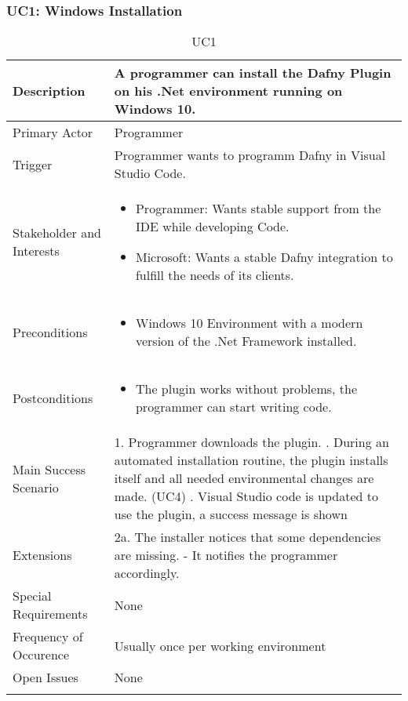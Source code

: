 \subsubsection{UC1: Windows Installation}
\begin{longtable}{l | p{} }
	Description & A programmer can install the Dafny Plugin on his .Net environment running on Windows 10.\\ \hline
	Primary Actor & Programmer\\ \hline
	Trigger & Programmer wants to programm Dafny in Visual Studio Code.\\ \hline
	Stakeholder and Interests & 
	\begin{itemize}
		\item Programmer: Wants stable support from the IDE while developing Code.
		\item Microsoft: Wants a stable Dafny integration to fulfill the needs of its clients.
	\end{itemize} \\ \hline
	Preconditions & 
 \begin{itemize}
		\item Windows 10 Environment with a modern version of the .Net Framework installed.
	\end{itemize} \\ \hline
	Postconditions & 
	\begin{itemize}
		\item The plugin works without problems, the programmer can start writing code.
	\end{itemize} \\ \hline
	Main Success Scenario & 1. Programmer downloads the plugin. \newline
	2. During an automated installation routine, the plugin installs itself and all needed environmental changes are made. (UC4) \newline
	3. Visual Studio code is updated to use the plugin, a success message is shown\\ \hline
	Extensions & 
	2a. The installer notices that some dependencies are missing. \newline 
	- It notifies the programmer accordingly.\\ \hline
	Special Requirements & None\\ \hline
	Frequency of Occurence & Usually once per working environment\\ \hline
	Open Issues & None \\ \hline
	\caption{UC1}
\end{longtable}
